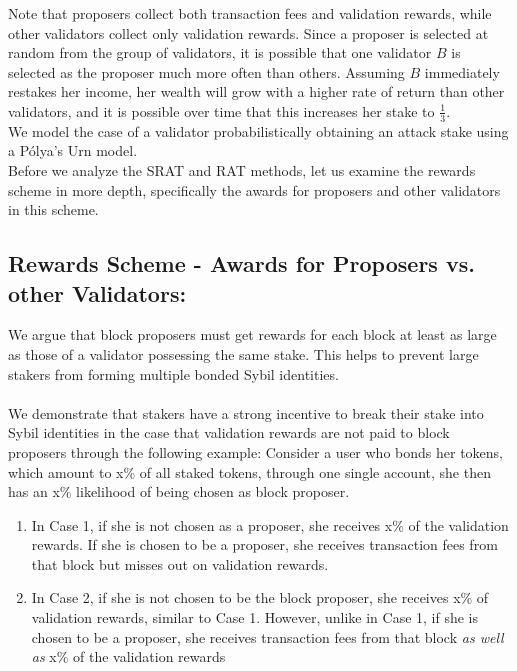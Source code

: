 \documentclass{article}
\renewcommand{\|}{\;|\;}
\begin{document}
Note that proposers collect both transaction fees and validation rewards, while other validators collect only validation rewards. Since a proposer is selected at random from the group of validators, it is possible that one validator $B$ is selected as the proposer much more often than others. Assuming $B$ immediately restakes her income, her wealth will grow with a higher rate of return than other validators, and it is possible over time that this increases her stake to $\frac{1}{3}$. \\

We model the case of a validator probabilistically obtaining an attack stake using a P\'olya's Urn model. \\

Before we analyze the SRAT and RAT methods, let us examine the rewards scheme in more depth, specifically the awards for proposers and other validators in this scheme. 


\subsection{Rewards Scheme - Awards for Proposers vs. other Validators:}

We argue that block proposers must get rewards for each block at least as large as those of a validator possessing the same stake. This helps to prevent large stakers from forming multiple bonded Sybil identities.\\ \\
We demonstrate that stakers have a strong incentive to break their stake into Sybil identities in the case that validation rewards are not paid to block proposers through the following example:\newline \newline
Consider a user who bonds her tokens, which amount to x\% of all staked tokens, through one single account, she then has an x\% likelihood of being chosen as block proposer.
\begin{enumerate}
  \item In Case 1, if she is not chosen as a  proposer, she receives x\% of the validation rewards. If she is chosen to be a proposer, she receives transaction fees from that block but misses out on validation rewards.
  \item In Case 2, if she is not chosen to be the block proposer, she receives x\% of validation rewards, similar to Case 1. However, unlike in Case 1, if she is chosen to be a proposer, she receives transaction fees from that block \textit{as well as} x\% of the validation rewards
\end{enumerate}\newline \newline
\end{document}
